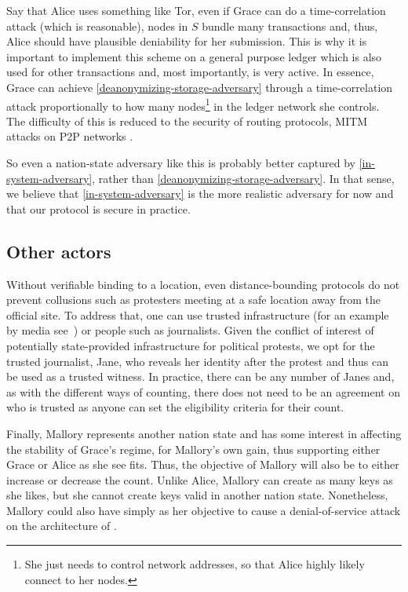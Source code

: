 Say that Alice uses something like Tor, even if Grace can do a time-correlation 
attack (which is reasonable), nodes in \(S\) bundle many transactions and, 
thus, Alice should have plausible deniability for her submission.
This is why it is important to implement this scheme on a general purpose 
ledger which is also used for other transactions and, most importantly, is very 
active.
In essence, Grace can achieve \cref{deanonymizing-storage-adversary} through a 
time-correlation attack proportionally to how many nodes\footnote{%
  She just needs to control network addresses, so that Alice highly likely 
  connect to her nodes.
} in the ledger network she controls.
The difficulty of this is reduced to the security of routing protocols, 
\ac{MITM} attacks on \ac{P2P} networks \etc.

So even a nation-state adversary like this is probably better captured by 
\cref{in-system-adversary}, rather than \cref{deanonymizing-storage-adversary}.
In that sense, we believe that \cref{in-system-adversary} is the more realistic 
adversary for now and that our protocol is secure in practice.


\subsection{Other actors}

Without verifiable binding to a location, even distance-bounding protocols do not prevent collusions such as protesters meeting at a safe location away from the official site. 
To address that, one can use trusted infrastructure (for an example by media see~\cite{LeMondeProtestingSolution}) or people such as journalists. 
Given the conflict of interest of potentially state-provided infrastructure for political protests, we opt for the trusted journalist, Jane, who reveals her identity after the protest and thus can be used as a trusted witness. 
In practice, there can be any number of  Janes and, as with the different ways of counting, there does not need to be an agreement on who is trusted as anyone can set the eligibility criteria for their count.

Finally, Mallory represents another nation state and has some interest in affecting the stability of Grace's regime, for Mallory's own gain, thus supporting either Grace or Alice as she see fits.  
Thus, the objective of Mallory will also be to either increase or decrease the count. 
Unlike Alice, Mallory can create as many keys as she likes, but she cannot create keys valid in another nation state. 
Nonetheless, Mallory could also have simply as her objective to cause a denial-of-service attack on the architecture of \CROCUS.


